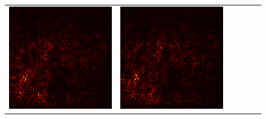 \documentclass[preprint,12pt]{elsarticle}
\begin{document}
\begin{figure}[p]
\begin{tabular}{cccccc}
  \includegraphics[scale=\scale]{../visualizations/examples/imagenette/resnet18/positive_saliency_map/4.png} & 
  \includegraphics[scale=\scale]{../visualizations/examples/imagenette/resnet18/negative_saliency_map/4.png} & 

\end{tabular}
\end{figure}
\end{document}
